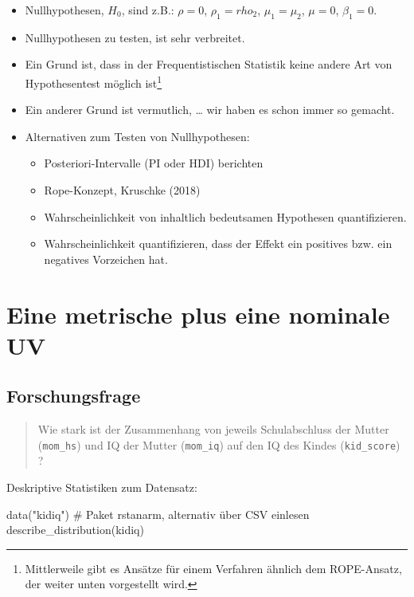 \documentclass[
  a4paper,
  DIV=11]{scrreprt}
\newenvironment{Shaded}{\begin{snugshade}}{\end{snugshade}}
\newcommand{\CommentTok}[1]{\textcolor[rgb]{0.37,0.37,0.37}{#1}}
\newcommand{\FunctionTok}[1]{\textcolor[rgb]{0.28,0.35,0.67}{#1}}
\newcommand{\NormalTok}[1]{\textcolor[rgb]{0.00,0.23,0.31}{#1}}
\newcommand{\StringTok}[1]{\textcolor[rgb]{0.13,0.47,0.30}{#1}}
\providecommand{\tightlist}{%
  \setlength{\itemsep}{0pt}\setlength{\parskip}{0pt}}\usepackage{longtable,booktabs,array}
\theoremstyle{definition}
\theoremstyle{remark}
\begin{document}
\begin{itemize}
\item
  Nullhypothesen, \(H_0\), sind z.B.: \(\rho=0\), \(\rho_1 = rho_2\),
  \(\mu_1 = \mu_2\), \(\mu=0\), \(\beta_1=0\).
\item
  Nullhypothesen zu testen, ist sehr verbreitet.
\item
  Ein Grund ist, dass in der Frequentistischen Statistik keine andere
  Art von Hypothesentest möglich ist\footnote{Mittlerweile gibt es
    Ansätze für einem Verfahren ähnlich dem ROPE-Ansatz, der weiter
    unten vorgestellt wird.}
\item
  Ein anderer Grund ist vermutlich, \ldots{} wir haben es schon immer so
  gemacht.
\item
  Alternativen zum Testen von Nullhypothesen:

  \begin{itemize}
  \tightlist
  \item
    Posteriori-Intervalle (PI oder HDI) berichten
  \item
    Rope-Konzept, Kruschke (2018)
  \item
    Wahrscheinlichkeit von inhaltlich bedeutsamen Hypothesen
    quantifizieren.
  \item
    Wahrscheinlichkeit quantifizieren, dass der Effekt ein positives
    bzw. ein negatives Vorzeichen hat.
  \end{itemize}
\end{itemize}

\hypertarget{eine-metrische-plus-eine-nominale-uv}{%
\section{Eine metrische plus eine nominale
UV}\label{eine-metrische-plus-eine-nominale-uv}}

\hypertarget{forschungsfrage-1}{%
\subsection{Forschungsfrage}\label{forschungsfrage-1}}

\begin{quote}
Wie stark ist der Zusammenhang von jeweils Schulabschluss der Mutter
(\texttt{mom\_hs}) und IQ der Mutter (\texttt{mom\_iq}) auf den IQ des
Kindes (\texttt{kid\_score}) ?
\end{quote}

Deskriptive Statistiken zum Datensatz:

\begin{Shaded}
\begin{Highlighting}[]
\FunctionTok{data}\NormalTok{(}\StringTok{"kidiq"}\NormalTok{)  }\CommentTok{\# Paket rstanarm, alternativ über CSV einlesen}
\FunctionTok{describe\_distribution}\NormalTok{(kidiq)}
\end{Highlighting}
\end{Shaded}
\end{document}
